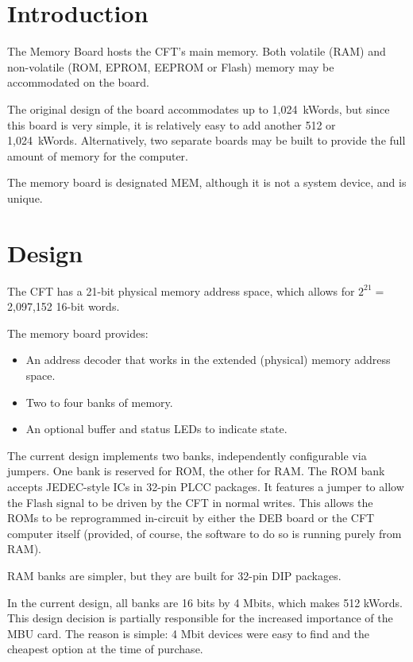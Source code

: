 \label{chap:mem}
\section{Introduction}

The Memory Board hosts the CFT's main memory. Both volatile (RAM) and
non-volatile (ROM, EPROM, EEPROM or Flash) memory may be accommodated on the
board.

The original design of the board accommodates up to 1,024~kWords, but since
this board is very simple, it is relatively easy to add another 512 or
1,024~kWords. Alternatively, two separate boards may be built to provide the
full amount of memory for the computer.

The memory board is designated \gls{MEM}, although it is not a system device,
and is unique.

\section{Design}

The CFT has a 21-bit physical memory address space, which allows for $2^{21}
=$~ 2,097,152 16-bit words.

The memory board provides:

\begin{itemize}
\item An address decoder that works in the extended (physical) memory address
  space.
\item Two to four banks of memory.
\item An optional buffer and status LEDs to indicate state.
\end{itemize}

The current design implements two banks, independently configurable via
jumpers. One bank is reserved for ROM, the other for RAM. The ROM bank accepts
JEDEC-style ICs in 32-pin \gls{PLCC} packages. It features a jumper to allow
the Flash  signal to be driven by the CFT in normal writes. This allows
the ROMs to be reprogrammed in-circuit by either the \gls{DEB} board or the CFT
computer itself (provided, of course, the software to do so is running purely
from RAM).

RAM banks are simpler, but they are built for 32-pin \gls{DIP} packages.

In the current design, all banks are 16 bits by 4 Mbits, which makes 512
kWords. This design decision is partially responsible for the increased
importance of the \gls{MBU} card. The reason is simple: 4 Mbit devices were
easy to find and the cheapest option at the time of purchase.

